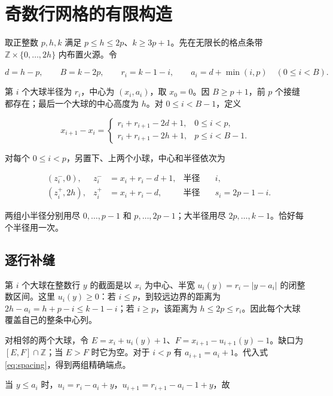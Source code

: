 \documentclass[UTF8,a4paper,11pt,fontset=fandol]{ctexart}
\begin{document}
\section{奇数行网格的有限构造}

取正整数 $p,h,k$ 满足 $p\le h\le 2p$、$k\ge 3p+1$。先在无限长的格点条带 $\mathbb{Z}\times\{0,\ldots,2h\}$ 内布置火源。令

\[
d=h-p,\qquad B=k-2p,\qquad
r_i=k-1-i,\qquad a_i=d+\min(i,p)
\quad(0\le i<B).
\]

第 $i$ 个大球半径为 $r_i$，中心为 $(x_i,a_i)$，取 $x_0=0$。因 $B\ge p+1$，前 $p$ 个接缝都存在；最后一个大球的中心高度为 $h$。对 $0\le i<B-1$，定义

\begin{equation}\label{eq:spacing}
x_{i+1}-x_i=
\begin{cases}
r_i+r_{i+1}-2d+1, & 0\le i<p,\\
r_i+r_{i+1}-2h+1, & p\le i<B-1.
\end{cases}
\end{equation}

对每个 $0\le i<p$，另置下、上两个小球，中心和半径依次为

\begin{equation}\label{eq:small}
\begin{aligned}
&(z_i^{-},0),  &z_i^{-}&=x_i+r_i-d+1, &\text{半径}&\quad i,\\
&(z_i^{+},2h), &z_i^{+}&=x_i+r_i-d,   &\text{半径}&\quad s_i=2p-1-i.
\end{aligned}
\end{equation}

两组小半径分别用尽 $0,\ldots,p-1$ 和 $p,\ldots,2p-1$；大半径用尽 $2p,\ldots,k-1$。恰好每个半径用一次。

\subsection{逐行补缝}

第 $i$ 个大球在整数行 $y$ 的截面是以 $x_i$ 为中心、半宽 $u_i(y)=r_i-|y-a_i|$ 的闭整数区间。这里 $u_i(y)\ge0$：若 $i\le p$，到较远边界的距离为 $2h-a_i=h+p-i\le k-1-i$；若 $i\ge p$，该距离为 $h\le2p\le r_i$。因此每个大球覆盖自己的整条中心列。

对相邻的两个大球，令 $E=x_i+u_i(y)+1$、$F=x_{i+1}-u_{i+1}(y)-1$。缺口为 $[E,F]\cap\mathbb{Z}$；当 $E>F$ 时它为空。对于 $i<p$ 有 $a_{i+1}=a_i+1$。代入式 \eqref{eq:spacing}，得到两组精确端点。

当 $y\le a_i$ 时，$u_i=r_i-a_i+y$，$u_{i+1}=r_{i+1}-a_i-1+y$，故
\end{document}
